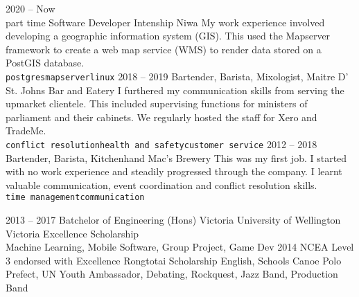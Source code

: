 \documentclass[9pt]{developercv} %
\begin{document}
\begin{entrylist}
	\entry
		{2020 -- Now\\\footnotesize{part time}}
		{Software Developer Intenship}
		{Niwa}
		{
			My work experience involved developing a geographic information system (GIS). This used the Mapserver framework to create a web map service (WMS) to render data stored on a PostGIS database.
			\\
			\texttt{postgres}\slashsep\texttt{mapserver}\slashsep\texttt{linux}
		}
	\entry
		{2018 -- 2019}
		{Bartender, Barista, Mixologist, Maitre D'}
		{St. Johns Bar and Eatery}
		{
			I furthered my communication skills from serving the upmarket clientele. This included supervising functions for ministers of parliament and their cabinets. We regularly hosted the staff for Xero and TradeMe.
			\\
			\texttt{conflict resolution}\slashsep\texttt{health and safety}\slashsep\texttt{customer service}
		}
	\entry
		{2012 -- 2018}
		{Bartender, Barista, Kitchenhand}
		{Mac's Brewery}
		{
			This was my first job. I started with no work experience and steadily progressed through the company. I learnt valuable communication, event coordination and conflict resolution skills.
			\\
			\texttt{time management}\slashsep\texttt{communication}
		}
\end{entrylist}



\begin{entrylist}
	\entry
		{2013 -- 2017}
		{Batchelor of Engineering (Hons)}
		{Victoria University of Wellington}
		{
			Victoria Excellence Scholarship \\
			Machine Learning, Mobile Software, Group Project, Game Dev
		}
	\entry
		{2014}
		{NCEA Level 3 endorsed with Excellence}
		{Rongtotai}
		{
			Scholarship English, Schools Canoe Polo \\
			Prefect, UN Youth Ambassador, Debating, Rockquest, Jazz Band, Production Band
		}
\end{entrylist}

\end{document}
